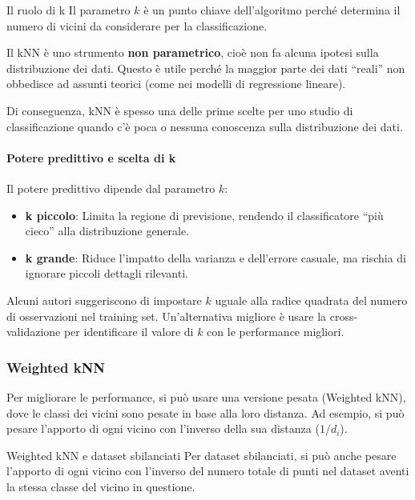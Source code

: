 \begin{nota}{Il ruolo di k}{}
    Il parametro $k$ è un punto chiave dell'algoritmo perché determina il
    numero di vicini da considerare per la classificazione.
\end{nota}

Il kNN è uno strumento \textbf{non parametrico}, cioè non fa alcuna ipotesi
sulla distribuzione dei dati.
Questo è utile perché la maggior parte dei dati ``reali'' non obbedisce ad
assunti teorici (come nei modelli di regressione lineare).

Di conseguenza, kNN è spesso una delle prime scelte per uno studio di
classificazione quando c'è poca o nessuna conoscenza sulla distribuzione
dei dati.

\paragraph{Potere predittivo e scelta di k}
Il potere predittivo dipende dal parametro $k$:
\begin{itemize}
    \item \textbf{k piccolo}: Limita la regione di previsione, rendendo il
    classificatore ``più cieco'' alla distribuzione generale.
    \item \textbf{k grande}: Riduce l'impatto della varianza e dell'errore
    casuale, ma rischia di ignorare piccoli dettagli rilevanti.
\end{itemize}

Alcuni autori suggeriscono di impostare $k$ uguale alla radice quadrata del
numero di osservazioni nel training set.
Un'alternativa migliore è usare la cross-validazione per identificare il
valore di $k$ con le performance migliori.

\subsubsection{Weighted kNN}
Per migliorare le performance, si può usare una versione pesata (Weighted kNN),
dove le classi dei vicini sono pesate in base alla loro distanza.
Ad esempio, si può pesare l'apporto di ogni vicino con l'inverso della sua
distanza ($1/d_i$).

\begin{nota}{Weighted kNN e dataset sbilanciati}{}
Per dataset sbilanciati, si può anche pesare l'apporto di ogni vicino con
l'inverso del numero totale di punti nel dataset aventi la stessa classe del
vicino in questione.
\end{nota}

